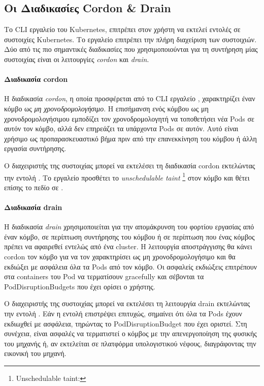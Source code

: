 \subsection{Οι Διαδικασίες Cordon \& Drain}

Το CLI εργαλείο   του Kubernetes, επιτρέπει στον χρήστη να εκτελεί
εντολές σε συστοιχίες Kubernetes. Το εργαλείο επιτρέπει την πλήρη διαχείριση των
συστοιχιών. Δύο από τις πιο σημαντικές διαδικασίες που χρησιμοποιούνται για τη
συντήρηση μίας συστοιχίας είναι οι λειτουργίες \textit{cordon} και
\textit{drain}.

\paragraph*{Διαδικασία cordon}

Η διαδικασία \textit{cordon}, η οποία προσφέρεται από το CLI εργαλείο ,
χαρακτηρίζει έναν κόμβο ως \textit{μη χρονοδρομολογήσιμο}. Η επισήμανση ενός
κόμβου ως μη χρονοδρομολογήσιμου εμποδίζει τον χρονοδρομολογητή να τοποθετήσει
νέα Pods σε αυτόν τον κόμβο, αλλά δεν επηρεάζει τα υπάρχοντα Pods σε αυτόν. Αυτό
είναι χρήσιμο ως προπαρασκευαστικό βήμα πριν από την επανεκκίνηση του κόμβου ή
άλλη εργασία συντήρησης.

Ο διαχειριστής της συστοιχίας μπορεί να εκτελέσει τη διαδικασία cordon
εκτελώντας την εντολή . Το εργαλείο προσθέτει το
\textit{unschedulable taint} \footnote{Unschedulable taint:
} στον κόμβο και θέτει επίσης το
πεδίο  σε .

\paragraph*{Διαδικασία drain}

Η διαδικασία \textit{drain} χρησιμοποιείται για την απομάκρυνση του φορτίου
εργασίας από έναν κόμβο, σε περίπτωση συντήρησης του κόμβου ή σε περίπτωση που
ένας κόμβος πρέπει να αφαιρεθεί εντελώς από ένα cluster. Η λειτουργία
αποστράγγισης θα κάνει cordon τον κόμβο για να τον χαρακτηρίσει ως μη
χρονοδρομολογήσιμο και θα εκδιώξει με ασφάλεια όλα τα Pods από τον κόμβο.  Οι
ασφαλείς εκδιώξεις επιτρέπουν στα containers του Pod να τερματίσουν
gracefully και σέβονται τα PodDisruptionBudgets που έχει ορίσει ο χρήστης.

Ο διαχειριστής της συστοιχίας μπορεί να εκτελέσει τη λειτουργία drain εκτελώντας
την εντολή . Εάν η εντολή επιστρέψει επιτυχώς, σημαίνει ότι
όλα τα Pods έχουν εκδιωχθεί με ασφάλεια, τηρώντας το PodDisruptionBudget που
έχει οριστεί. Στη συνέχεια, είναι ασφαλές να τερματιστεί ο κόμβος με την
απενεργοποίηση της φυσικής του μηχανής ή, αν εκτελείται σε πλατφόρμα
υπολογιστικού νέφους, διαγράφοντας την εικονική του μηχανή.

